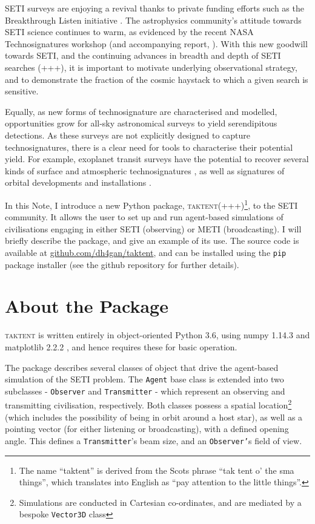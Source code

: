 \documentclass[RNAAS]{aastex62}
\begin{document}
SETI surveys are enjoying a revival thanks to private funding efforts such as the Breakthrough Listen initiative \citep{Isaacson2017}.  The astrophysics community's attitude towards SETI science continues to warm, as evidenced by the recent NASA Technosignatures workshop (and accompanying report, \citealt{Participants2018}).   With this new goodwill towards SETI, and the continuing advances in breadth and depth of SETI searches (+++), it is important to motivate underlying observational strategy, and to demonstrate the fraction of the cosmic haystack to which a given search is sensitive.  

Equally, as new forms of technosignature are characterised and modelled, opportunities grow for all-sky astronomical surveys to yield serendipitous detections.  As these surveys are not explicitly designed to capture technosignatures, there is a clear need for tools to characterise their potential yield.  For example, exoplanet transit surveys have the potential to recover several kinds of surface and atmospheric technosignatures \citep[e.g.][]{Lin2014,Korpela2015,Lingam2017a}, as well as signatures of orbital developments and installations \citep[e.g.][]{Socas-Navarro2018}.

In this Note, I introduce a new Python package, \textsc{taktent}(+++)\footnote{The name ``taktent'' is derived from the Scots phrase ``tak tent o' the sma things'', which translates into English as ``pay attention to the little things''.}, to the SETI community.  It allows the user to set up and run agent-based simulations of civilisations engaging in either SETI (observing) or METI (broadcasting).  I will briefly describe the package, and give an example of its use.  The source code is available at \url{github.com/dh4gan/taktent}, and can be installed using the \texttt{pip} package installer (see the github repository for further details).

\section{About the Package}

\noindent \textsc{taktent} is written entirely in object-oriented Python 3.6, using numpy 1.14.3 \citep{Oliphant2006} and matplotlib 2.2.2 \citep{Hunter2007}, and hence requires these for basic operation.  

The package describes several classes of object that drive the agent-based simulation of the SETI problem.  The \texttt{Agent} base class is extended into two subclasses - \texttt{Observer} and \texttt{Transmitter} - which represent an observing and transmitting civilisation, respectively.  Both classes possess a spatial location\footnote{Simulations are conducted in Cartesian co-ordinates, and are mediated by a bespoke \texttt{Vector3D} class} (which includes the possibility of being in orbit around a host star), as well as a pointing vector (for either listening or broadcasting), with a defined opening angle.  This defines a \texttt{Transmitter}'s beam size, and an \texttt{Observer'}s field of view.
\end{document}
